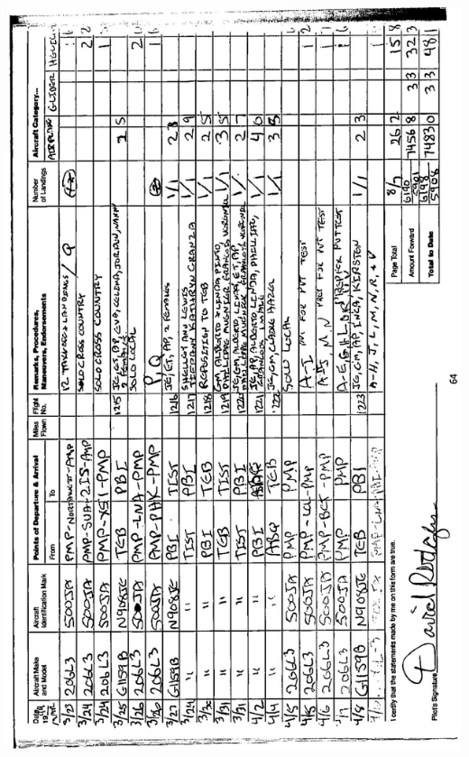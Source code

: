 \documentclass[10pt]{article}
\begin{document}
\includegraphics[max width=\textwidth, center]{2025_02_27_dd68c3d38de88f0516d9g-068}\\
\end{document}
